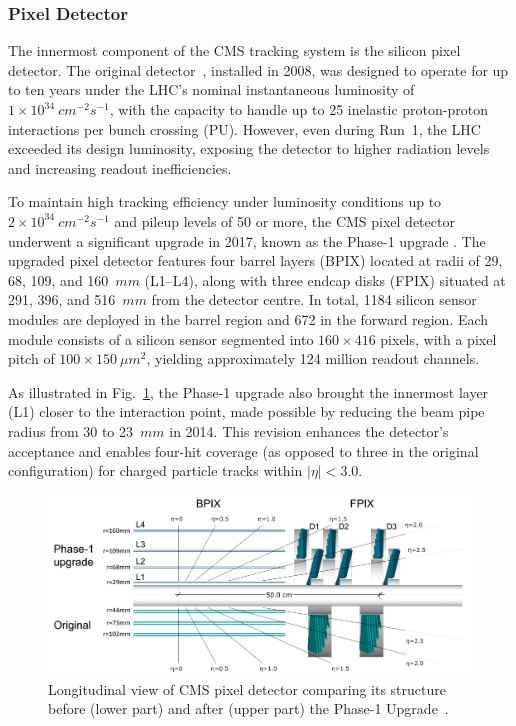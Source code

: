 \subsubsection{Pixel Detector}
The innermost component of the CMS tracking system is the silicon pixel detector. The original detector~\cite{LHC_CMS}, installed in 2008, was designed to operate for up to ten years under the LHC’s nominal instantaneous luminosity of $1 \times 10^{34}~\unit{cm}^{-2}\unit{s}^{-1}$, with the capacity to handle up to 25 inelastic proton-proton interactions per bunch crossing (PU). However, even during Run~1, the LHC exceeded its design luminosity, exposing the detector to higher radiation levels and increasing readout inefficiencies.

To maintain high tracking efficiency under luminosity conditions up to $2 \times 10^{34}~\unit{cm}^{-2}\unit{s}^{-1}$ and pileup levels of 50 or more, the CMS pixel detector underwent a significant upgrade in 2017, known as the Phase-1 upgrade \cite{CMS_Detector_Run3, CMS_Tracker_Phase1_Upgrade}. The upgraded pixel detector features four barrel layers (BPIX) located at radii of 29, 68, 109, and 160~$\unit{mm}$ (L1–L4), along with three endcap disks (FPIX) situated at 291, 396, and 516~$\unit{mm}$ from the detector centre. In total, 1184 silicon sensor modules are deployed in the barrel region and 672 in the forward region. Each module consists of a silicon sensor segmented into $160 \times 416$ pixels, with a pixel pitch of $100 \times 150~\unit{\mu m}^2$, yielding approximately 124 million readout channels.

As illustrated in Fig.~\ref{Figure:Chapter3_Pixel_Upgrade}, the Phase-1 upgrade also brought the innermost layer (L1) closer to the interaction point, made possible by reducing the beam pipe radius from 30 to 23~$\unit{mm}$ in 2014. This revision enhances the detector's acceptance and enables four-hit coverage (as opposed to three in the original configuration) for charged particle tracks within $|\eta| < 3.0$.

\begin{figure}[h]
\centering
\includegraphics[width= 1\textwidth]{Figures/Chapter3/CMS_Pixel_Upgrade.pdf}
\caption{Longitudinal view of CMS pixel detector comparing its structure before (lower part) and after (upper part) the Phase-1 Upgrade~\cite{LHC_Run3}.}
\label{Figure:Chapter3_Pixel_Upgrade}
\end{figure}

